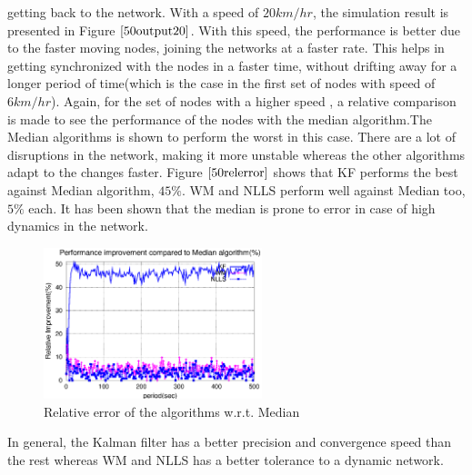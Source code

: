 \documentclass[journal]{IEEEtran}
\begin{document}
getting back to the network. \newline With a speed of $20km/hr$, the
simulation result is presented in Figure $\ref{50output20}$. With
this speed, the performance is better due to the faster moving
nodes, joining the networks at a faster rate. This helps in getting
synchronized with the nodes in a faster time, without drifting away
for a longer period of time(which is the case in the first set of
nodes with speed of $6km/hr$). Again, for the set of nodes with a
higher speed , a relative comparison is made to see the performance
of the nodes with the median algorithm.\newline The Median
algorithms is shown to perform the worst in this case. There are a
lot of disruptions in the network, making it more unstable whereas
the other algorithms adapt to the changes faster.\newline
Figure $\ref{50relerror}$ shows that KF performs the best
against Median algorithm, $45\%$. WM and NLLS perform well against
Median too, $5\%$ each. It has been shown that the median is
prone to error in case of high dynamics in the network.
\begin{figure}
\centering \includegraphics[width=2.5in]{50output-error}
\caption{Relative error of the algorithms w.r.t. Median}
\label{50relerror}
\end{figure}
In general, the Kalman filter has a better precision and convergence
speed than the rest whereas WM and NLLS has a better tolerance to a dynamic network.
\end{document}
